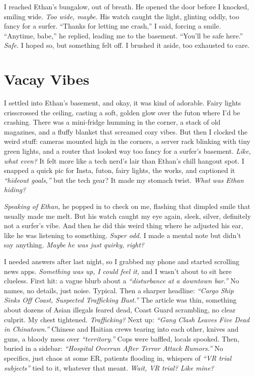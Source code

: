 \documentclass[12pt]{article}
\begin{document}
I reached \textnormal{Ethan}’s bungalow, out of breath. He opened the door before I knocked, smiling wide. \textit{Too wide, maybe.} His watch caught the light, glinting oddly, too fancy for a surfer. “Thanks for letting me crash,” I said, forcing a smile. “Anytime, babe,” he replied, leading me to the basement. “You’ll be safe here.” \textit{Safe.} I hoped so, but something felt off. I brushed it aside, too exhausted to care.

\section{Vacay Vibes}

I settled into \textnormal{Ethan}’s basement, and okay, it was kind of adorable. Fairy lights crisscrossed the ceiling, casting a soft, golden glow over the futon where I’d be crashing. There was a mini-fridge humming in the corner, a stack of old magazines, and a fluffy blanket that screamed cozy vibes. But then I clocked the weird stuff: cameras mounted high in the corners, a server rack blinking with tiny green lights, and a router that looked way too fancy for a surfer’s basement. \textit{Like, what even?} It felt more like a tech nerd’s lair than \textnormal{Ethan}’s chill hangout spot. I snapped a quick pic for Insta, futon, fairy lights, the works, and captioned it \textit{“hideout goals,”} but the tech gear? It made my stomach twist. \textit{What was \textnormal{Ethan} hiding?}

\textit{Speaking of \textnormal{Ethan},} he popped in to check on me, flashing that dimpled smile that usually made me melt. But his watch caught my eye again, sleek, silver, definitely not a surfer’s vibe. And then he did this weird thing where he adjusted his ear, like he was listening to something. \textit{Super odd.} I made a mental note but didn’t say anything. \textit{Maybe he was just quirky, right?}

I needed answers after last night, so I grabbed my phone and started scrolling news apps. \textit{Something was up, I could feel it,} and I wasn’t about to sit here clueless. First hit: a vague blurb about a \textit{“disturbance at a downtown bar.”} No names, no details, just noise. Typical. Then a sharper headline: \textit{“Cargo Ship Sinks Off Coast, Suspected Trafficking Bust.”} The article was thin, something about dozens of Asian illegals feared dead, Coast Guard scrambling, no clear culprit. My chest tightened. \textit{Trafficking?} Next up: \textit{“Gang Clash Leaves Five Dead in Chinatown.”} Chinese and Haitian crews tearing into each other, knives and guns, a bloody mess over \textit{“territory.”} Cops were baffled, locals spooked. Then, buried in a sidebar: \textit{“Hospital Overrun After Terror Attack Rumors.”} No specifics, just chaos at some ER, patients flooding in, whispers of \textit{“VR trial subjects”} tied to it, whatever that meant. \textit{Wait, VR trial? Like mine?}
\end{document}
